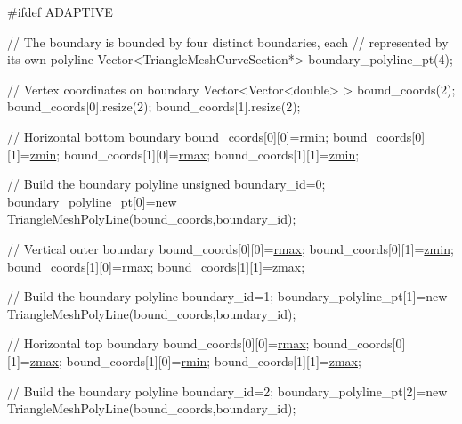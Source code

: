 \begin{DoxyCodeInclude}
\textcolor{preprocessor}{#ifdef ADAPTIVE}

 \textcolor{comment}{// The boundary is bounded by four distinct boundaries, each}
 \textcolor{comment}{// represented by its own polyline}
 Vector<TriangleMeshCurveSection*> boundary\_polyline\_pt(4);
 
 \textcolor{comment}{// Vertex coordinates on boundary}
 Vector<Vector<double> > bound\_coords(2);
 bound\_coords[0].resize(2);
 bound\_coords[1].resize(2);
     
 \textcolor{comment}{// Horizontal bottom boundary}
 bound\_coords[0][0]=\hyperlink{namespaceGlobal__Parameters_ad454d80ae621f272dd1d7932249545a5}{rmin};
 bound\_coords[0][1]=\hyperlink{namespaceGlobal__Parameters_ac6a17dbcf1b8f1136a1ec5c07efef708}{zmin};
 bound\_coords[1][0]=\hyperlink{namespaceGlobal__Parameters_a5d7fb394c980bb4bf2a52158f9d7cc50}{rmax};
 bound\_coords[1][1]=\hyperlink{namespaceGlobal__Parameters_ac6a17dbcf1b8f1136a1ec5c07efef708}{zmin};
 
 \textcolor{comment}{// Build the boundary polyline}
 \textcolor{keywordtype}{unsigned} boundary\_id=0;
 boundary\_polyline\_pt[0]=\textcolor{keyword}{new} TriangleMeshPolyLine(bound\_coords,boundary\_id);
 
 \textcolor{comment}{// Vertical outer boundary}
 bound\_coords[0][0]=\hyperlink{namespaceGlobal__Parameters_a5d7fb394c980bb4bf2a52158f9d7cc50}{rmax};
 bound\_coords[0][1]=\hyperlink{namespaceGlobal__Parameters_ac6a17dbcf1b8f1136a1ec5c07efef708}{zmin};
 bound\_coords[1][0]=\hyperlink{namespaceGlobal__Parameters_a5d7fb394c980bb4bf2a52158f9d7cc50}{rmax};
 bound\_coords[1][1]=\hyperlink{namespaceGlobal__Parameters_a8ee2afb91b9b105939f19a0efa8e1441}{zmax};
 
 \textcolor{comment}{// Build the boundary polyline}
 boundary\_id=1;
 boundary\_polyline\_pt[1]=\textcolor{keyword}{new} TriangleMeshPolyLine(bound\_coords,boundary\_id);
 

 \textcolor{comment}{// Horizontal top boundary}
 bound\_coords[0][0]=\hyperlink{namespaceGlobal__Parameters_a5d7fb394c980bb4bf2a52158f9d7cc50}{rmax};
 bound\_coords[0][1]=\hyperlink{namespaceGlobal__Parameters_a8ee2afb91b9b105939f19a0efa8e1441}{zmax};
 bound\_coords[1][0]=\hyperlink{namespaceGlobal__Parameters_ad454d80ae621f272dd1d7932249545a5}{rmin};
 bound\_coords[1][1]=\hyperlink{namespaceGlobal__Parameters_a8ee2afb91b9b105939f19a0efa8e1441}{zmax};
 
 \textcolor{comment}{// Build the boundary polyline}
 boundary\_id=2;
 boundary\_polyline\_pt[2]=\textcolor{keyword}{new} TriangleMeshPolyLine(bound\_coords,boundary\_id);
 

\end{DoxyCodeInclude}
